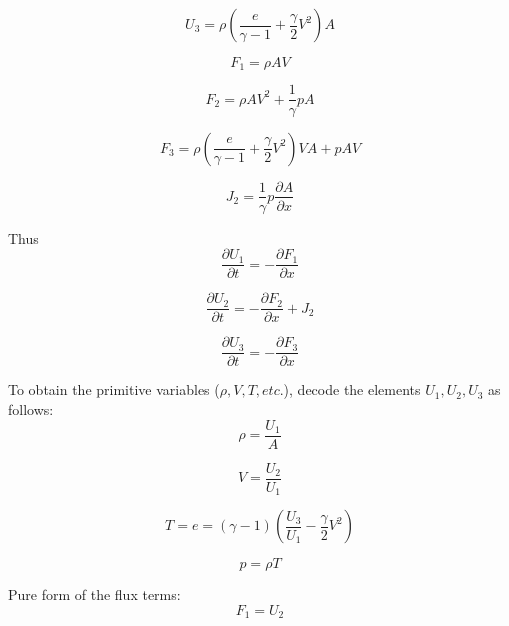 \begin{equation}
U_3 = \rho(\frac{e}{\gamma-1}+\frac{\gamma}{2}V^2)A
\end{equation}

\begin{equation}
F_1 = \rho A V
\end{equation}

\begin{equation}
F_2 = \rho A V^2 +\frac{1}{\gamma} p A
\end{equation}

\begin{equation}
F_3 = \rho ( \frac{e}{\gamma -1} +\frac{\gamma}{2} V^2) V A + p A V
\end{equation}

\begin{equation}
J_2 = \frac{1}{\gamma} p \frac{\partial A}{\partial x}
\end{equation}

Thus
\begin{equation}
\frac{\partial U_1}{\partial t} = -\frac{\partial F_1}{\partial x}
\end{equation}

\begin{equation}
\frac{\partial U_2}{\partial t} = -\frac{\partial F_2}{\partial x}+J_2
\end{equation}

\begin{equation}
\frac{\partial U_3}{\partial t} = -\frac{\partial F_3}{\partial x}
\end{equation}

To obtain the primitive variables ($\rho, V, T, etc.$), decode the elements $U_1, U_2, U_3$ as follows:
\begin{equation}
\rho = \frac{U_1}{A}
\end{equation}

\begin{equation}
V = \frac{U_2}{U_1}
\end{equation}

\begin{equation}
T=e=(\gamma-1)(\frac{U_3}{U_1}-\frac{\gamma}{2}V^2)
\end{equation}

\begin{equation}
p = \rho T
\end{equation}

Pure form of the flux terms:
\begin{equation}
F_1 = U_2
\end{equation}


